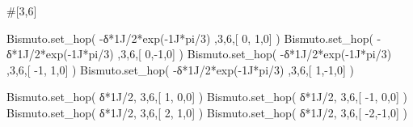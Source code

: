 \documentclass[
  letterpaper,
  DIV=11,
  numbers=noendperiod]{scrreprt}
\newenvironment{Shaded}{\begin{snugshade}}{\end{snugshade}}
\newcommand{\CommentTok}[1]{\textcolor[rgb]{0.37,0.37,0.37}{#1}}
\newcommand{\DecValTok}[1]{\textcolor[rgb]{0.68,0.00,0.00}{#1}}
\newcommand{\NormalTok}[1]{\textcolor[rgb]{0.00,0.23,0.31}{#1}}
\newcommand{\OperatorTok}[1]{\textcolor[rgb]{0.37,0.37,0.37}{#1}}
\newcommand{\OtherTok}[1]{\textcolor[rgb]{0.00,0.23,0.31}{#1}}
\begin{document}
\begin{Shaded}
\begin{Highlighting}[]
\CommentTok{\#[3,6]}

\NormalTok{Bismuto.set\_hop(  }\OperatorTok{{-}}\NormalTok{δ}\OperatorTok{*}\OtherTok{1J}\OperatorTok{/}\DecValTok{2}\OperatorTok{*}\NormalTok{exp(}\OperatorTok{{-}}\OtherTok{1J}\OperatorTok{*}\NormalTok{pi}\OperatorTok{/}\DecValTok{3}\NormalTok{) ,}\DecValTok{3}\NormalTok{,}\DecValTok{6}\NormalTok{,[  }\DecValTok{0}\NormalTok{, }\DecValTok{1}\NormalTok{,}\DecValTok{0}\NormalTok{] )}
\NormalTok{Bismuto.set\_hop(  }\OperatorTok{{-}}\NormalTok{δ}\OperatorTok{*}\OtherTok{1J}\OperatorTok{/}\DecValTok{2}\OperatorTok{*}\NormalTok{exp(}\OperatorTok{{-}}\OtherTok{1J}\OperatorTok{*}\NormalTok{pi}\OperatorTok{/}\DecValTok{3}\NormalTok{) ,}\DecValTok{3}\NormalTok{,}\DecValTok{6}\NormalTok{,[  }\DecValTok{0}\NormalTok{,}\OperatorTok{{-}}\DecValTok{1}\NormalTok{,}\DecValTok{0}\NormalTok{] )}
\NormalTok{Bismuto.set\_hop(  }\OperatorTok{{-}}\NormalTok{δ}\OperatorTok{*}\OtherTok{1J}\OperatorTok{/}\DecValTok{2}\OperatorTok{*}\NormalTok{exp(}\OperatorTok{{-}}\OtherTok{1J}\OperatorTok{*}\NormalTok{pi}\OperatorTok{/}\DecValTok{3}\NormalTok{) ,}\DecValTok{3}\NormalTok{,}\DecValTok{6}\NormalTok{,[ }\OperatorTok{{-}}\DecValTok{1}\NormalTok{, }\DecValTok{1}\NormalTok{,}\DecValTok{0}\NormalTok{] )}
\NormalTok{Bismuto.set\_hop(  }\OperatorTok{{-}}\NormalTok{δ}\OperatorTok{*}\OtherTok{1J}\OperatorTok{/}\DecValTok{2}\OperatorTok{*}\NormalTok{exp(}\OperatorTok{{-}}\OtherTok{1J}\OperatorTok{*}\NormalTok{pi}\OperatorTok{/}\DecValTok{3}\NormalTok{) ,}\DecValTok{3}\NormalTok{,}\DecValTok{6}\NormalTok{,[  }\DecValTok{1}\NormalTok{,}\OperatorTok{{-}}\DecValTok{1}\NormalTok{,}\DecValTok{0}\NormalTok{] )}

\NormalTok{Bismuto.set\_hop(   δ}\OperatorTok{*}\OtherTok{1J}\OperatorTok{/}\DecValTok{2}\NormalTok{, }\DecValTok{3}\NormalTok{,}\DecValTok{6}\NormalTok{,[  }\DecValTok{1}\NormalTok{, }\DecValTok{0}\NormalTok{,}\DecValTok{0}\NormalTok{] )}
\NormalTok{Bismuto.set\_hop(   δ}\OperatorTok{*}\OtherTok{1J}\OperatorTok{/}\DecValTok{2}\NormalTok{, }\DecValTok{3}\NormalTok{,}\DecValTok{6}\NormalTok{,[ }\OperatorTok{{-}}\DecValTok{1}\NormalTok{, }\DecValTok{0}\NormalTok{,}\DecValTok{0}\NormalTok{] )}
\NormalTok{Bismuto.set\_hop(   δ}\OperatorTok{*}\OtherTok{1J}\OperatorTok{/}\DecValTok{2}\NormalTok{, }\DecValTok{3}\NormalTok{,}\DecValTok{6}\NormalTok{,[  }\DecValTok{2}\NormalTok{, }\DecValTok{1}\NormalTok{,}\DecValTok{0}\NormalTok{] )}
\NormalTok{Bismuto.set\_hop(   δ}\OperatorTok{*}\OtherTok{1J}\OperatorTok{/}\DecValTok{2}\NormalTok{, }\DecValTok{3}\NormalTok{,}\DecValTok{6}\NormalTok{,[ }\OperatorTok{{-}}\DecValTok{2}\NormalTok{,}\OperatorTok{{-}}\DecValTok{1}\NormalTok{,}\DecValTok{0}\NormalTok{] ) }


\end{Highlighting}
\end{Shaded}
\end{document}
